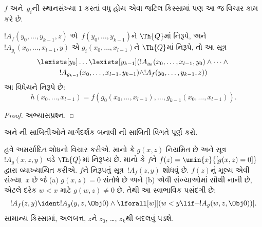 $f$ અને~$g_i$ની સ્થાનસંખ્યા
$1$ કરતાં વધુ હોય એવા જટિલ
કિસ્સામાં પણ આ જ વિચાર કામ કરે છે.

\begin{prop}
$!A_f(y_0, \dots, y_{k-1}, z)$
એ~$f(y_0, \dots, y_{k-1})$ને
$\Th{Q}$માં નિરૂપે, અને
$!A_{g_i}(x_0, \dots, x_{l-1}, y)$
એ $g_i(x_0, \dots, x_{l-1})$ને
$\Th{Q}$માં નિરૂપે, તો આ સૂત્ર
\begin{multline*}
  \lexists[y_0]\dots\lexists[y_{k-1}]
  (!A_{g_0}(x_0,\dots,x_{l-1},y_0) \land
      \dots \land {}\\
  !A_{g_{k-1}}(x_0,\dots,x_{l-1},y_{k-1}) \land !A_f(y_0,\dots,y_{k-1},z))
\end{multline*}
આ વિધેયને નિરૂપે છે:
\[
h(x_0, \dots, x_{l-1}) = f(g_0(x_0, \dots, x_{l-1}), \dots, g_{k-1}(x_0,
\dots, x_{l-1})).
\]
\end{prop}

\begin{proof}
અભ્યાસપ્રશ્ન.
\end{proof}

\begin{prob}
અને ની
સાબિતીઓને માર્ગદર્શક બનાવી
ની
સાબિતી વિગતે પૂર્ણ કરો.
\end{prob}
\endgroup


\begingroup
\makeatletter{}\makeatother

\label{guunit:OLP-0296}


હવે અમર્યાદિત શોધનો વિચાર કરીએ.
માનો કે $g(x, z)$ નિયમિત છે અને
સૂત્ર~$!A_g(x, z, y)$ વડે
$\Th{Q}$માં નિરૂપ્ય છે.
માનો કે $f$ને
$f(z) = \umin{x}{[g(x, z) = 0]}$
દ્વારા વ્યાખ્યાયિત કરીએ.
$f$ને નિરૂપતું
સૂત્ર~$!A_f(z, y)$ શોધવું છે.
$f(z)$નું મૂલ્ય એવી સંખ્યા~$x$
છે જે (a) $g(x, z) = 0$ સંતોષે
છે અને (b) એવી સંખ્યાઓમાં સૌથી
નાની છે, એટલે દરેક $w < x$
માટે $g(w, z) \neq 0$ છે.
તેથી આ સ્વાભાવિક પસંદગી છે:
\[
!A_f(z,y) \ident !A_g(y, z, \Obj 0) \land \lforall[w][(w < y \lif \lnot
  !A_g(w, z, \Obj 0))].
\]
સામાન્ય કિસ્સામાં, અલબત્ત,
$z$ને $z_0$, \dots, $z_k$થી
બદલવું પડશે.

